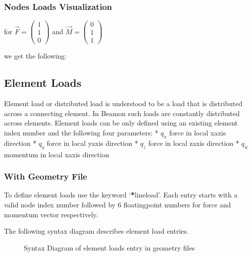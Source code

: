 \documentclass[letterpaper,10pt,english]{sphinxmanual}
\begin{document}
\subsubsection{Nodes Loads Visualization}
\label{\detokenize{making_a_model:nodes-loads-visualization}}
for \(\vec{F}= \left(\begin{array}{c} 1 \\ 1 \\ 0 \end{array}\right)\) and
\(\vec{M}= \left(\begin{array}{c} 0 \\ 1 \\ 1 \end{array}\right)\)

we get the following:

\noindent{}


\subsection{Element Loads}
\label{\detokenize{making_a_model:element-loads}}
Element load or distributed load is understood to be a load that is distributed across a connecting element.
In Beamon such loads are constantly distributed across elements.
Element loads can be only defined using an existing element index number and the following four parameters:
* \(q_x\) force in local x\sphinxhyphen{}axis direction
* \(q_y\) force in local y\sphinxhyphen{}axis direction
* \(q_z\) force in local z\sphinxhyphen{}axis direction
* \(q_w\) momentum in local x\sphinxhyphen{}axis direction


\subsubsection{With Geometry File}
\label{\detokenize{making_a_model:id15}}
To define element loads use the keyword ‘{\color{red}\bfseries{}*}lineload’. Each entry starts with a valid node index number followed by 6
floating\sphinxhyphen{}point numbers for force and momentum vector respectively.

The following syntax diagram describes element load entries.

\begin{figure}[htbp]
\centering
\capstart

\noindent{}
\caption{Syntax Diagram of element loads entry in geometry files}\label{\detokenize{making_a_model:id26}}\end{figure}
\end{document}
